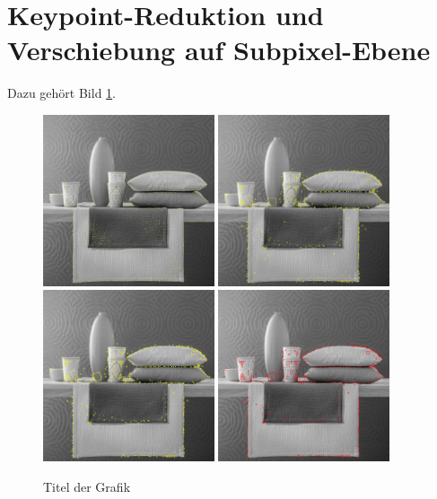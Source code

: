 \documentclass[a4paper,12pt]{scrartcl}
\begin{document}
\section{Keypoint-Reduktion und Verschiebung auf Subpixel-Ebene}
Dazu gehört Bild \ref{Bild2}.

\begin{figure}[htbp]
  \centering
  \includegraphics[width=0.45\textwidth]{2SubpixelmHintergrund} 
  \includegraphics[width=0.45\textwidth]{4RechteckemHkorrigiert} 
  \includegraphics[width=0.45\textwidth]{5RechteckOrientierung} 
  \includegraphics[width=0.45\textwidth]{6RechteckOrientierungLastVer} 
  \caption{Titel der Grafik}
  \label{Bild2}
\end{figure}
\end{document}
